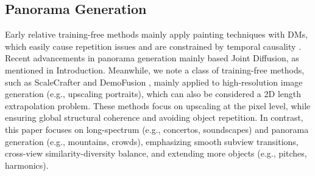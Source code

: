 \subsection{Panorama Generation}
Early relative training-free methods \cite{Avrahami2022BlendedLD, Avrahami2021BlendedDF, esser2021taming} mainly apply painting techniques with DMs, which easily cause repetition issues and are constrained by temporal causality \cite{lee2023syncdiffusion, Quattrini2024MergingAS}. Recent advancements in panorama generation mainly based Joint Diffusion, as mentioned in Introduction. Meanwhile, we note a class of training-free methods, such as ScaleCrafter and DemoFusion \cite{he2023scalecrafter, du2024demofusion}, mainly applied to high-resolution image generation (e.g., upscaling portraits), which can also be considered a 2D length extrapolation problem. These methods focus on upscaling at the pixel level, while ensuring global structural coherence and avoiding object repetition. In contrast, this paper focuses on long-spectrum (e.g., concertos, soundscapes) and panorama generation (e.g., mountains, crowds), emphasizing smooth subview transitions, cross-view similarity-diversity balance, and extending more objects (e.g., pitches, harmonics).
